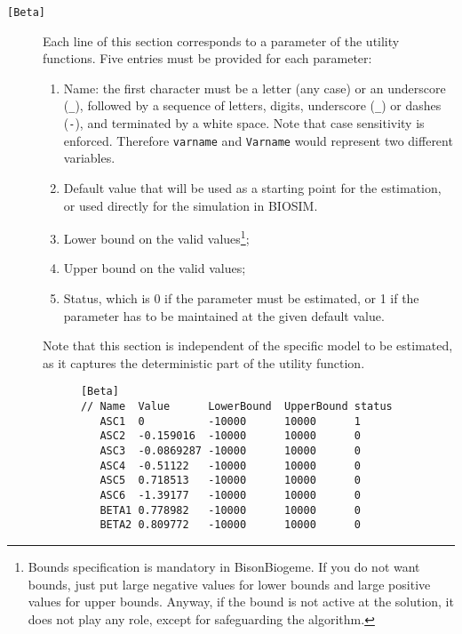 \documentclass[12pt,a4paper]{article}
\newcommand{\specitem}[1]{\texttt{[#1]}}
\newcommand{\BBIOGEME}{BisonBiogeme}
\begin{document}
\begin{description}
   \item[\specitem{Beta}]
      Each line of this section corresponds to a parameter of the utility
      functions. Five entries must be provided for each parameter:
      \begin{enumerate}
         \item Name: the first character must be a letter (any case) or an underscore
            (\verb+_+), followed by a sequence of letters, digits, underscore (\verb+_+)
            or dashes (\verb+-+), and terminated by a white space. Note that case sensitivity is enforced. 
            Therefore \verb+varname+ and \verb+Varname+ would represent two different variables.
         \item Default value that will be used as a starting point for the estimation, or used directly for the simulation in BIOSIM.
         \item Lower bound on the valid values\footnote{Bounds specification is mandatory in \BBIOGEME. If you do not want bounds, just put large negative values for lower bounds and large positive values for upper bounds. Anyway, if the bound is not active at the solution, it does not play any role, except for safeguarding the algorithm.};
         \item Upper bound on the valid values;
         \item Status, which is 0 if the parameter must be estimated, or 1 if the parameter has to be maintained at the given default value. 
      \end{enumerate}
      Note that this section is independent of the specific model to be
      estimated, as it captures the deterministic part of the utility function.

      \begin{verbatim}
      [Beta]
      // Name  Value      LowerBound  UpperBound status
         ASC1  0          -10000      10000      1
         ASC2  -0.159016  -10000      10000      0
         ASC3  -0.0869287 -10000      10000      0
         ASC4  -0.51122   -10000      10000      0
         ASC5  0.718513   -10000      10000      0
         ASC6  -1.39177   -10000      10000      0
         BETA1 0.778982   -10000      10000      0
         BETA2 0.809772   -10000      10000      0
      \end{verbatim} 


\end{description}
\end{document}
